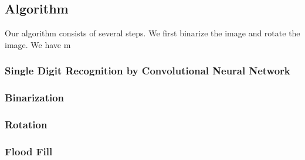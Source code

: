 \documentclass[10pt,twocolumn,letterpaper]{article}
\begin{document}
%
%
%
%
%
%


\subsection{Algorithm}

Our algorithm consists of several steps. We first binarize the image and rotate the image.
We have m

\subsubsection{Single Digit Recognition by Convolutional Neural Network}

\subsubsection{Binarization}

\subsubsection{Rotation}

\subsubsection{Flood Fill}
\end{document}
